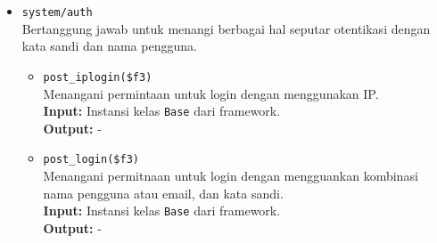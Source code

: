 \begin{itemize}
        \item \texttt{system/auth} \\
            Bertanggung jawab untuk menangi berbagai hal seputar otentikasi dengan kata
            sandi dan nama pengguna.
            \begin{itemize}
                \item \texttt{post\_iplogin(\$f3)}\\
                    Menangani permintaan untuk login dengan menggunakan IP.\\
                    \textbf{Input:} Instansi kelas \texttt{Base} dari framework.\\
                    \textbf{Output:} -\\
                
                \item \texttt{post\_login(\$f3)}\\
                    Menangani permitnaan untuk login dengan mengguankan kombinasi
                    nama pengguna atau email, dan kata sandi.\\
                    \textbf{Input:} Instansi kelas \texttt{Base} dari framework.\\
                    \textbf{Output:} -\\
            \end{itemize}
    \end{itemize}
    
